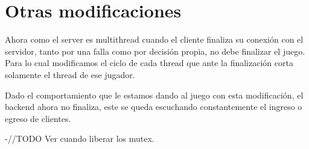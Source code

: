 \section{Otras modificaciones}

Ahora como el server es multithread cuando el cliente finaliza su conexi\'on con el servidor, tanto por una falla como por decisi\'on propia, no debe finalizar el juego. Para lo cual modificamos el ciclo de cada thread que ante la finalizaci\'on  corta solamente el thread de ese jugador.

Dado el comportamiento que le estamos dando al juego con esta modificaci\'on, el backend ahora no finaliza, este se queda escuchando constantemente el ingreso o egreso de clientes.

-//TODO Ver cuando liberar los mutex.